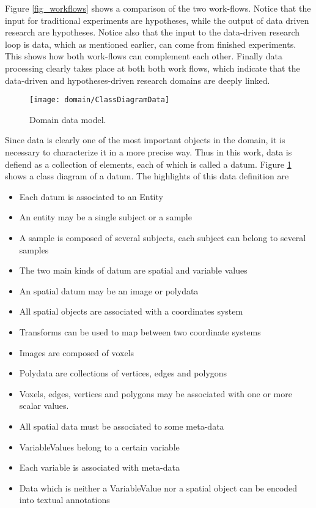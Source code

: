 Figure \ref{fig_workflows} shows a comparison of the two work-flows. Notice that the input for traditional experiments are hypotheses, while the output of data driven research are  hypotheses. Notice also that the input to the data-driven research loop is data, which as mentioned earlier, can come from finished experiments. This shows how both work-flows can complement each other. Finally data processing clearly takes place at both both work flows, which indicate that the data-driven and hypotheses-driven research domains are deeply linked.  

\begin{figure}
\centering
\texttt{[image: domain/ClassDiagramData]}
\caption{\label{fig_datum_class} Domain data model.}
\end{figure}

Since data is clearly one of the most important objects in the domain, it is necessary to characterize it in a more precise way. Thus in this work, data is defiend as a collection of elements, each of which is called a datum. Figure \ref{fig_datum_class} shows a class diagram of a datum. The highlights of this data definition are


\begin{itemize}
\item Each datum is associated to an Entity
\item An entity may be a single subject or a sample
\item A sample is composed of several subjects, each subject can belong to several samples
\item The two main kinds of datum are spatial and variable values
\item An spatial datum may be an image or polydata
\item All spatial objects are associated with a coordinates system
\item Transforms can be used to map between two coordinate systems
\item Images are composed of voxels
\item Polydata are collections of vertices, edges and polygons
\item Voxels, edges, vertices and polygons may be associated with one or more scalar values.
\item All spatial data must be associated to some meta-data
\item VariableValues belong to a certain variable
\item Each variable is associated with meta-data  
\item Data which is neither a VariableValue nor a spatial object can be encoded into textual annotations
\end{itemize} 


